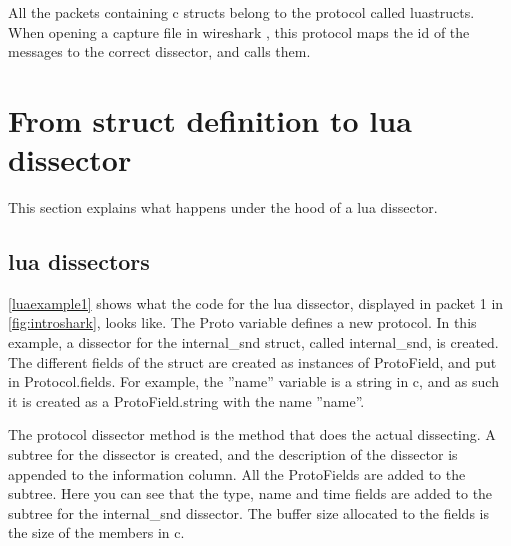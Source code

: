 All the \glspl{packet} containing \Gls{c} \glspl{struct} belong to the \gls{protocol} called luastructs.
When opening a capture file in \Gls{wireshark} , this \gls{protocol} maps the id of the messages to the correct \gls{dissector},
and calls them.



\section{From \Gls{struct} definition to \Gls{lua} \Gls{dissector}}
This section explains what happens under the hood of a \Gls{lua} \gls{dissector}.

\subsection{\Gls{lua} \Glspl{dissector}}
\autoref{luaexample1} shows what the code for the \Gls{lua} \gls{dissector}, displayed in \gls{packet} 1 in \autoref{fig:introshark}, looks like.
The Proto variable defines a new \gls{protocol}. In this example, a \gls{dissector} for the internal\_snd \gls{struct}, called internal\_snd, is created. 
The different fields of the \gls{struct} are created as instances of ProtoField, and put in Protocol.fields.
For example, the ''name'' variable is a \gls{string} in \Gls{c}, and as such it is created as a ProtoField.\gls{string} with the 
name ''name''.

The \gls{protocol} \gls{dissector} method is the method that does the actual dissecting.
A subtree for the \gls{dissector} is created, and the description of the \gls{dissector} is appended to the information column.
All the ProtoFields are added to the subtree. Here you can see that the type, name and time fields are added to the subtree for the internal\_snd \gls{dissector}.
The buffer size allocated to the fields is the size of the \glspl{member} in \Gls{c}.

